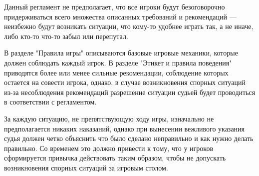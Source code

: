 Данный регламент не предполагает, что все игроки будут безоговорочно придерживаться всего множества описанных требований и рекомендаций --- неизбежно будут возникать ситуации, что кому-то удобнее играть так, а не иначе, либо кто-то что-то забыл или перепутал.

В разделе "Правила игры" описываются базовые игровые механики, которые должен соблюдать каждый игрок. В разделе "Этикет и правила поведения" приводятся более или менее сильные рекомендации, соблюдение которых остается на совести игрока, однако, в случае возникновения спорных ситуаций из-за несоблюдения рекомендаций разрешение ситуации судьей будет проводиться в соответствии с регламентом.

За каждую ситуацию, не препятствующую ходу игры, изначально не предполагается никаких наказаний, однако при вынесении вежливого указания судья должен четко объяснить что было сделано неправильно и как нужно делать правильно. Со временем это должно привести к тому, что у игроков сформируется привычка действовать таким образом, чтобы не допускать возникновения спорных ситуаций за игровым столом.
